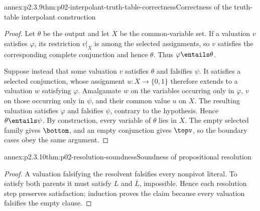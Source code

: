 \begin{annexitem}{annex:p2.3.9}{thm:p02-interpolant-truth-table-correctness}{Correctness of the truth-table interpolant construction}
\begin{proof}
Let \(\theta\) be the output and let \(X\) be the common-variable set.  If a
valuation \(v\) satisfies \(\varphi\), its restriction \(v|_X\) is among the
selected assignments, so \(v\) satisfies the corresponding complete
conjunction and hence \(\theta\).  Thus
\(\varphi\entails\theta\).

Suppose instead that some valuation \(v\) satisfies \(\theta\) and falsifies
\(\psi\).  It satisfies a selected conjunction, whose assignment
\(u:X\to\{0,1\}\) therefore extends to a valuation \(w\) satisfying
\(\varphi\).  Amalgamate \(w\) on the variables occurring only in
\(\varphi\), \(v\) on those occurring only in \(\psi\), and their common
value \(u\) on \(X\).  The resulting valuation satisfies \(\varphi\) and
falsifies \(\psi\), contrary to the hypothesis.  Hence
\(\theta\entails\psi\).  By construction, every variable of \(\theta\) lies
in \(X\).  The empty selected family gives \(\bottom\), and an empty
conjunction gives \(\topv\), so the boundary cases obey the same argument.
\end{proof}
\end{annexitem}

\begin{annexitem}{annex:p2.3.10}{thm:p02-resolution-soundness}{Soundness of propositional resolution}
\begin{proof}
A valuation falsifying the resolvent falsifies every nonpivot literal.  To
satisfy both parents it must satisfy \(L\) and \(\overline L\), impossible.
Hence each resolution step preserves satisfaction; induction proves the claim
because every valuation falsifies the empty clause.
\end{proof}
\end{annexitem}

